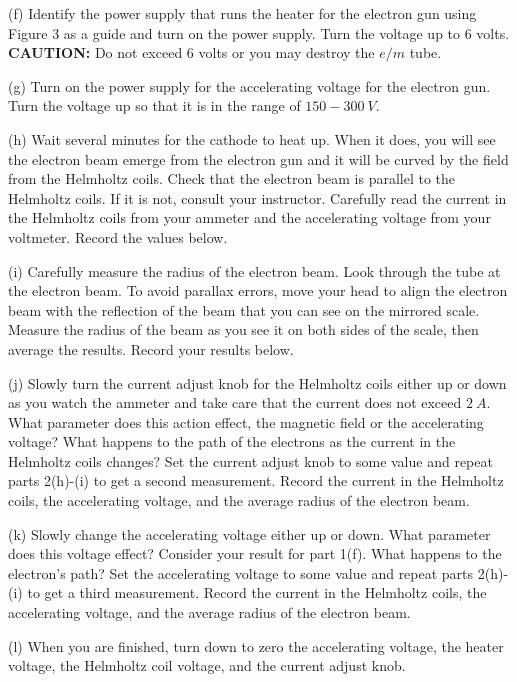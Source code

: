 (f) Identify the power supply that runs the heater for the electron gun using Figure 3 as a guide
and turn on the power supply. Turn the voltage up to 6 volts.
{\bf CAUTION:} Do not exceed 6 volts or you may destroy the $e/m$
tube.

(g) Turn on the power supply for the accelerating voltage for the electron gun.
Turn the voltage up so that it is in the range of $150-300~V$.

(h) Wait several minutes for the cathode to heat up. When
it does, you will see the electron beam emerge from
the electron gun and it will be curved by the field from
the Helmholtz coils. Check that the electron beam is
parallel to the Helmholtz coils. If it is not, consult your instructor.
 Carefully read the current in the Helmholtz coils from
your ammeter and the accelerating voltage from your
voltmeter. Record the values below.
\vspace{25mm}

(i) Carefully measure the radius of the electron beam.
Look through the tube at the electron beam. To avoid
parallax errors, move your head to align the electron
beam with the reflection of the beam that you can see
on the mirrored scale. Measure the radius of the beam as you
see it on both sides of the scale, then average the results.
Record your results below.
\vspace{25mm}

(j) Slowly turn the current adjust knob for the Helmholtz
coils either up or down as you watch the ammeter and take care that
the current does not exceed $2 ~A$.
What parameter does this action effect, the magnetic field or the
accelerating voltage?
What happens to the path of the electrons as the current in the Helmholtz
coils changes?
Set the current adjust knob to some value and
repeat parts 2(h)-(i) to get a second measurement. Record the current in the
Helmholtz coils, the accelerating voltage, and the average radius of the electron beam.
\vspace{30mm}

(k) Slowly change the accelerating voltage either up or down.
What parameter does this voltage effect? Consider your result for part 1(f).
What happens to the electron's path?
Set the accelerating voltage 
to some value and
repeat parts 2(h)-(i) to get a third measurement. Record the current in the
Helmholtz coils, the accelerating voltage, and the average radius of the electron beam.
\vspace{30mm}

(l) When you are finished, turn down to zero the accelerating voltage, the heater voltage, the Helmholtz coil voltage, and the current adjust knob.
\vspace{10mm}

